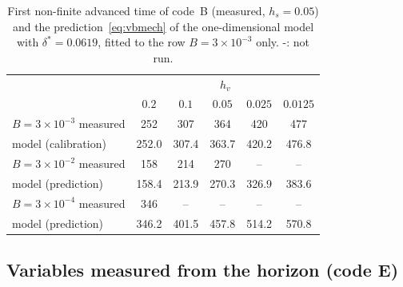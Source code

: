 \documentclass[11pt]{article}
\begin{document}
\begin{table}[ht]\centering\small
\caption{First non-finite advanced time of code~B (measured, $h_s=0.05$) and the prediction~\eqref{eq:vbmech} of the one-dimensional model with $\delta^{*}=0.0619$, fitted to the row $B=3\times10^{-3}$ only. -: not run.}\label{tab:vbmech}
\begin{tabular}{lccccc}
\toprule
 & \multicolumn{5}{c}{$h_v$}\\
 & $0.2$ & $0.1$ & $0.05$ & $0.025$ & $0.0125$\\\midrule
$B=3\times10^{-3}$ measured & 252 & 307 & 364 & 420 & 477\\
\quad model (calibration) & 252.0 & 307.4 & 363.7 & 420.2 & 476.8\\
$B=3\times10^{-2}$ measured & 158 & 214 & 270 & -- & --\\
\quad model (prediction) & 158.4 & 213.9 & 270.3 & 326.9 & 383.6\\
$B=3\times10^{-4}$ measured & 346 & -- & -- & -- & --\\
\quad model (prediction) & 346.2 & 401.5 & 457.8 & 514.2 & 570.8\\\bottomrule
\end{tabular}
\end{table}

\subsection{Variables measured from the horizon (code E)}
\end{document}
